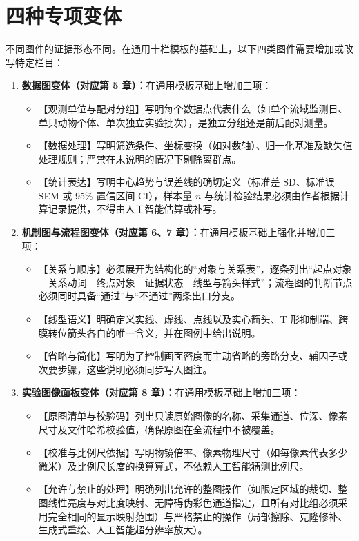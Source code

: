 \section{四种专项变体}

不同图件的证据形态不同。在通用十栏模板的基础上，以下四类图件需要增加或改写特定栏目：

\begin{enumerate}
  \item \textbf{数据图变体（对应第 5 章）：}在通用模板基础上增加三项：
  \begin{itemize}
    \item 【观测单位与配对分组】写明每个数据点代表什么（如单个流域监测日、单只动物个体、单次独立实验批次），是独立分组还是前后配对测量。
    \item 【数据处理】写明筛选条件、坐标变换（如对数轴）、归一化基准及缺失值处理规则；严禁在未说明的情况下剔除离群点。
    \item 【统计表达】写明中心趋势与误差线的确切定义（标准差 SD、标准误 SEM 或 95\% 置信区间 CI），样本量 $n$ 与统计检验结果必须由作者根据计算记录提供，不得由人工智能估算或补写。
  \end{itemize}
  \item \textbf{机制图与流程图变体（对应第 6、7 章）：}在通用模板基础上强化并增加三项：
  \begin{itemize}
    \item 【关系与顺序】必须展开为结构化的“对象与关系表”，逐条列出“起点对象—关系动词—终点对象—证据状态—线型与箭头样式”；流程图的判断节点必须同时具备“通过”与“不通过”两条出口分支。
    \item 【线型语义】明确定义实线、虚线、点线以及实心箭头、T 形抑制端、跨膜转位箭头各自的唯一含义，并在图例中给出说明。
    \item 【省略与简化】写明为了控制画面密度而主动省略的旁路分支、辅因子或次要步骤，这些说明必须同步写入图注。
  \end{itemize}
  \item \textbf{实验图像面板变体（对应第 8 章）：}在通用模板基础上增加三项：
  \begin{itemize}
    \item 【原图清单与校验码】列出只读原始图像的名称、采集通道、位深、像素尺寸及文件哈希校验值，确保原图在全流程中不被覆盖。
    \item 【校准与比例尺依据】写明物镜倍率、像素物理尺寸（如每像素代表多少微米）及比例尺长度的换算算式，不依赖人工智能猜测比例尺。
    \item 【允许与禁止的处理】明确列出允许的整图操作（如限定区域的裁切、整图线性亮度与对比度映射、无障碍伪彩色通道指定，且所有对比组必须采用完全相同的显示映射范围）与严格禁止的操作（局部擦除、克隆修补、生成式重绘、人工智能超分辨率放大）。

\end{itemize}
\end{enumerate}
